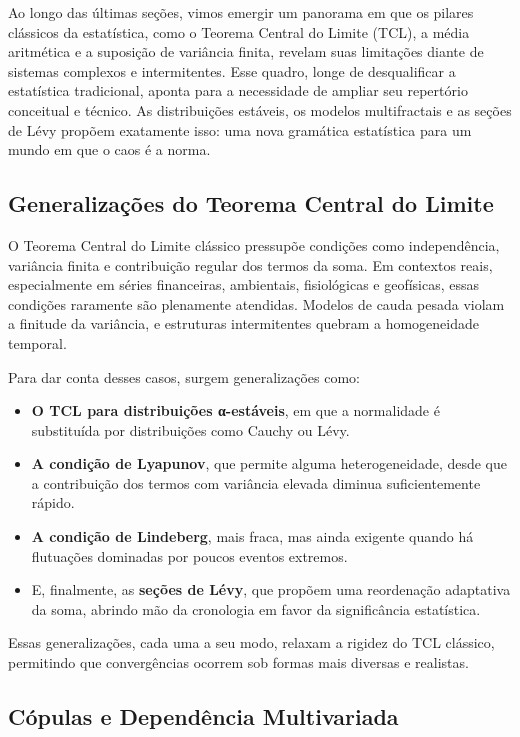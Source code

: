 \documentclass[
]{agujournal2019}
\providecommand{\tightlist}{%
  \setlength{\itemsep}{0pt}\setlength{\parskip}{0pt}}\usepackage{longtable,booktabs,array}
\begin{document}
Ao longo das últimas seções, vimos emergir um panorama em que os pilares
clássicos da estatística, como o Teorema Central do Limite (TCL), a
média aritmética e a suposição de variância finita, revelam suas
limitações diante de sistemas complexos e intermitentes. Esse quadro,
longe de desqualificar a estatística tradicional, aponta para a
necessidade de ampliar seu repertório conceitual e técnico. As
distribuições estáveis, os modelos multifractais e as seções de Lévy
propõem exatamente isso: uma nova gramática estatística para um mundo em
que o caos é a norma.

\subsection{Generalizações do Teorema Central do
Limite}\label{generalizauxe7uxf5es-do-teorema-central-do-limite}

O Teorema Central do Limite clássico pressupõe condições como
independência, variância finita e contribuição regular dos termos da
soma. Em contextos reais, especialmente em séries financeiras,
ambientais, fisiológicas e geofísicas, essas condições raramente são
plenamente atendidas. Modelos de cauda pesada violam a finitude da
variância, e estruturas intermitentes quebram a homogeneidade temporal.

Para dar conta desses casos, surgem generalizações como:

\begin{itemize}
\tightlist
\item
  \textbf{O TCL para distribuições α-estáveis}, em que a normalidade é
  substituída por distribuições como Cauchy ou Lévy.
\item
  \textbf{A condição de Lyapunov}, que permite alguma heterogeneidade,
  desde que a contribuição dos termos com variância elevada diminua
  suficientemente rápido.
\item
  \textbf{A condição de Lindeberg}, mais fraca, mas ainda exigente
  quando há flutuações dominadas por poucos eventos extremos.
\item
  E, finalmente, as \textbf{seções de Lévy}, que propõem uma reordenação
  adaptativa da soma, abrindo mão da cronologia em favor da
  significância estatística.
\end{itemize}

Essas generalizações, cada uma a seu modo, relaxam a rigidez do TCL
clássico, permitindo que convergências ocorrem sob formas mais diversas
e realistas.

\subsection{Cópulas e Dependência
Multivariada}\label{cuxf3pulas-e-dependuxeancia-multivariada}
\end{document}
